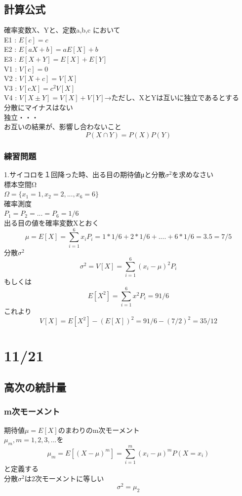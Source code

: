 \documentclass{jsarticle}
\begin{document}
	\subsection{計算公式}
		確率変数X、Yと、定数a,b,c において\\
		E1 : $E[c]=c$\\
		E2 : $E[aX+b]=aE[X]+b $\\
		E3 : $E[X+Y]=E[X]+E[Y]$\\
		V1 : $V[c]=0$\\
		V2 : $V[X+c]=V[X]$\\
		V3 : $V[cX]=c^2V[X]$\\
		V4 : $V[X±Y]=V[X]+V[Y]$→ただし、XとYは互いに独立であるとする\\
		分散にマイナスはない\\
		{\Large{独立・・・}}\\
		お互いの結果が、影響し合わないこと
		\[
			P(X\cap Y)=P(X)P(Y)
		\]
		\subsubsection{練習問題}
			1.サイコロを１回降った時、出る目の期待値μと分散$σ^2$を求めなさい\\
			標本空間Ω\\
			$Ω=\{x_1=1,x_2=2 ,... ,x_6=6\}$\\
			確率測度\\
			$P_1=P_2=...=P_6=1/6$\\
			出る目の値を確率変数Xとおく\\
			\[
				μ=E[X]=\sum^6_{i=1}x_iP_i
				=1*1/6+2*1/6+....+6*1/6
				=3.5=7/5
			\]
			分散$σ^2$
			\[
				σ^2=V[X]=\sum^6_{i=1}(x_i-μ)^2P_i
			\]
			もしくは
			\[
				E[X^2]=\sum^6_{i=1}x^2P_i
				=91/6
			\]
			これより
			\[
				V[X]=E[X^2]-(E[X])^2=91/6-(7/2)^2=35/12
			\]
			
\section{11/21}
\subsection{高次の統計量}
	\subsubsection{m次モーメント}
		期待値$μ=E[X]$のまわりのm次モーメント\\
		$μ_m , m=1,2,3,...$を
		\[
			μ_m=E[(X-μ)^m]=\sum^m_{i=1}(x_i-μ)^mP(X=x_i)
		\]
		と定義する\\
		分散$σ^2$は2次モーメントに等しい\\
		\[
			σ^2=μ_2
		\]
		
\end{document}
